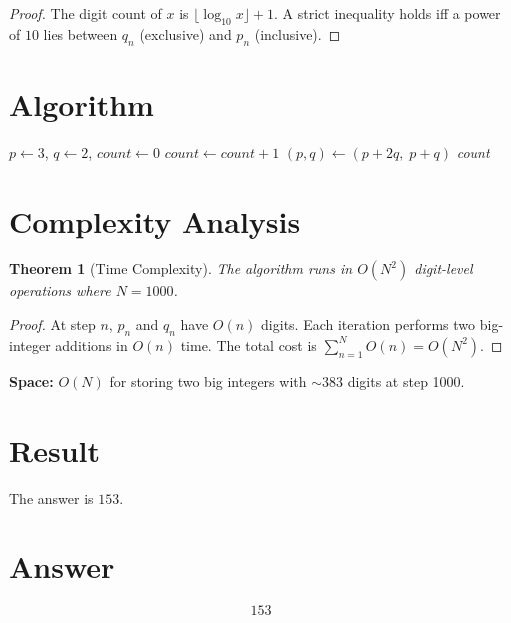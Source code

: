 \documentclass[12pt,a4paper]{article}
\newtheorem{theorem}{Theorem}
\theoremstyle{definition}
\theoremstyle{remark}
\begin{document}
\begin{proof}
The digit count of $x$ is $\lfloor \log_{10} x \rfloor + 1$. A strict inequality holds iff a power of $10$ lies between $q_n$ (exclusive) and $p_n$ (inclusive).
\end{proof}

\section{Algorithm}

\begin{algorithm}[H]
\caption{Count Digit-Excess Convergents}
\begin{algorithmic}[1]
\State $p \gets 3$, $q \gets 2$, $\textit{count} \gets 0$
        \State $\textit{count} \gets \textit{count} + 1$
    \EndIf
    \State $(p, q) \gets (p + 2q,\; p + q)$
\EndFor
\State \Return \textit{count}
\end{algorithmic}
\end{algorithm}

\section{Complexity Analysis}

\begin{theorem}[Time Complexity]
The algorithm runs in $O(N^2)$ digit-level operations where $N = 1000$.
\end{theorem}

\begin{proof}
At step $n$, $p_n$ and $q_n$ have $O(n)$ digits. Each iteration performs two big-integer additions in $O(n)$ time. The total cost is $\sum_{n=1}^{N} O(n) = O(N^2)$.
\end{proof}

\noindent\textbf{Space:} $O(N)$ for storing two big integers with $\sim 383$ digits at step 1000.

\section{Result}
The answer is $\boxed{153}$.

\section{Answer}

\[
\boxed{153}
\]
\end{document}
